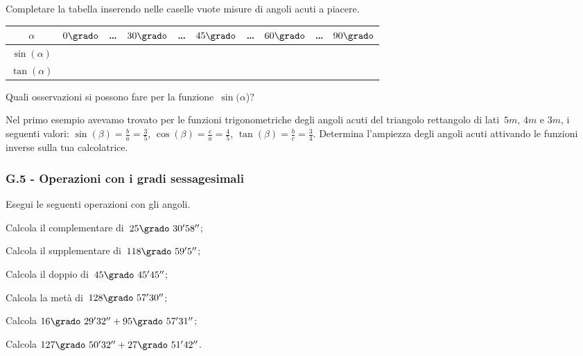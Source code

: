 \begin{esercizio}
\label{ese:G.4}
Completare la tabella inserendo nelle caselle vuote misure di angoli acuti a piacere.
\begin{center}
\begin{tabular}{cccccccccc}
\toprule
$\alpha$ & $0\grado$ & \ldots & $30\grado$ & \ldots & $45\grado$ & \ldots & $60\grado$ & \ldots & $90\grado$\\
\midrule
$\sin(\alpha)$ & & & & &  &  &  &  &  \\
$\tan(\alpha)$ & & &  &  &  &  &  &  &  \\
\bottomrule
\end{tabular}
\end{center}

Quali osservazioni si possono fare per la funzione~$\sin({\alpha}$)?
\end{esercizio}

\begin{esercizio}
\label{ese:G.5}
Nel primo esempio avevamo trovato per le funzioni trigonometriche degli angoli acuti del triangolo rettangolo di lati~$5\unit{m}$,
$4\unit{m}$ e $3\unit{m}$, i seguenti valori:
$\sin(\beta)=\frac{b}{a}=\frac{3}{5}$, $\cos(\beta)=\frac{c}{a}=\frac{4}{5}$, $\tan(\beta)=\frac{b}{c}=\frac{3}{4}$.
Determina l'ampiezza degli angoli acuti attivando le funzioni inverse sulla tua calcolatrice.
\end{esercizio}

\subsubsection*{G.5 - Operazioni con i gradi sessagesimali}

\begin{esercizio}
\label{ese:G.6}
Esegui le seguenti operazioni con gli angoli.
\begin{multicols}{2}
\begin{enumeratea}
 \item Calcola il complementare di~$25\grado~30' 58''$;
 \item Calcola il supplementare di~$118\grado~59' 5''$;
 \item Calcola il doppio di~$45\grado~45' 45''$;
 \item Calcola la metà di~$128\grado~57' 30''$;
 \item Calcola $16\grado~29' 32''+ 95\grado~57' 31''$;
 \item Calcola $127\grado~50' 32''+ 27\grado~51' 42''$.
\end{enumeratea}
\end{multicols}
\end{esercizio}


